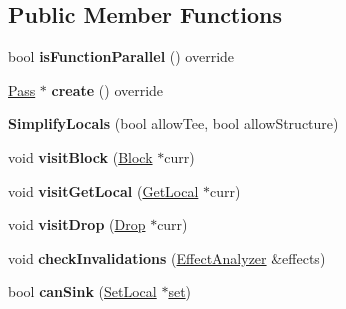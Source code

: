 \subsection*{Public Member Functions}
\begin{DoxyCompactItemize}
\item 
\mbox{\label{structwasm_1_1_simplify_locals_a07cc362fcc42021dc6a5d37f8b52becb}} 
bool {\bfseries is\+Function\+Parallel} () override
\item 
\mbox{\label{structwasm_1_1_simplify_locals_af2bc1e8825564cba732f6d56b68a0a0a}} 
\mbox{\hyperlink{classwasm_1_1_pass}{Pass}} $\ast$ {\bfseries create} () override
\item 
\mbox{\label{structwasm_1_1_simplify_locals_a834d45c9bb05a424cf72a0ed4799bde8}} 
{\bfseries Simplify\+Locals} (bool allow\+Tee, bool allow\+Structure)
\item 
\mbox{\label{structwasm_1_1_simplify_locals_a02f24fb8d34f97da99abe6ee0967077a}} 
void {\bfseries visit\+Block} (\mbox{\hyperlink{classwasm_1_1_block}{Block}} $\ast$curr)
\item 
\mbox{\label{structwasm_1_1_simplify_locals_a23169ad15a5887e40a3065172796bc6d}} 
void {\bfseries visit\+Get\+Local} (\mbox{\hyperlink{classwasm_1_1_get_local}{Get\+Local}} $\ast$curr)
\item 
\mbox{\label{structwasm_1_1_simplify_locals_ad5230f35e94103fa00bfffdd950469a7}} 
void {\bfseries visit\+Drop} (\mbox{\hyperlink{classwasm_1_1_drop}{Drop}} $\ast$curr)
\item 
\mbox{\label{structwasm_1_1_simplify_locals_ac6b2106db63a31882f31ba09acd3e87b}} 
void {\bfseries check\+Invalidations} (\mbox{\hyperlink{structwasm_1_1_effect_analyzer}{Effect\+Analyzer}} \&effects)
\item 
\mbox{\label{structwasm_1_1_simplify_locals_a74e9c3f46122eb3b12dff66bf1603153}} 
bool {\bfseries can\+Sink} (\mbox{\hyperlink{classwasm_1_1_set_local}{Set\+Local}} $\ast$\mbox{\hyperlink{classstd_1_1set}{set}})

\end{DoxyCompactItemize}
